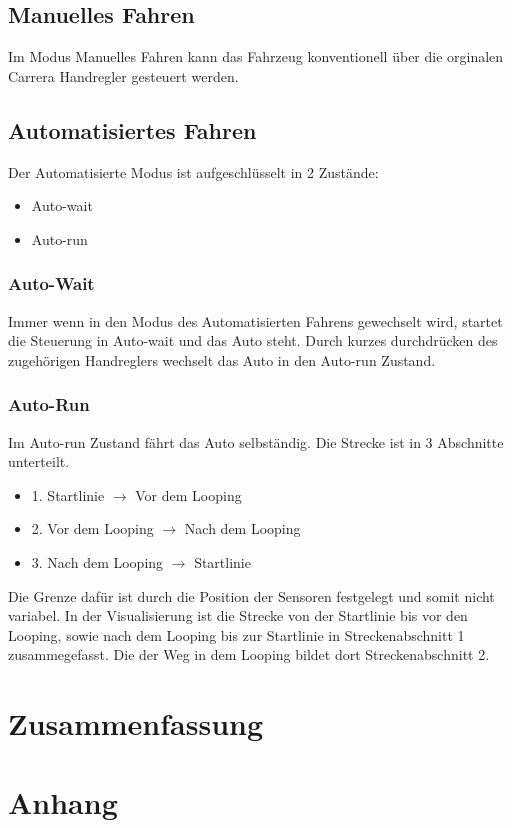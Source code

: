 \documentclass[a4paper, 11pt]{report}
\begin{document}
	\section{Manuelles Fahren}
		Im Modus Manuelles Fahren kann das Fahrzeug konventionell über die orginalen Carrera Handregler gesteuert
		werden.
	\section{Automatisiertes Fahren}
		Der Automatisierte Modus ist aufgeschlüsselt in 2 Zustände:
		\begin{itemize}
			\item Auto-wait
			\item Auto-run
		\end{itemize}
		\subsection{Auto-Wait}
		Immer wenn in den Modus des Automatisierten Fahrens gewechselt wird, startet die Steuerung in
		Auto-wait und das Auto steht.
		Durch kurzes durchdrücken des zugehörigen Handreglers wechselt das Auto in den Auto-run Zustand.
		\subsection{Auto-Run}
			Im Auto-run Zustand fährt das Auto selbständig. Die Strecke ist in 3 Abschnitte unterteilt.
			\begin{itemize}
				\item{1.} Startlinie $\rightarrow$ Vor dem Looping
				\item{2.} Vor dem Looping $\rightarrow$ Nach dem Looping
				\item{3.} Nach dem Looping $\rightarrow$ Startlinie
			\end{itemize}
			Die Grenze dafür ist durch die Position der Sensoren festgelegt und somit nicht variabel.
			In der Visualisierung ist die Strecke von der Startlinie bis vor den Looping, sowie nach dem Looping bis zur Startlinie in Streckenabschnitt 1 zusammegefasst.
			Die der Weg in dem Looping bildet dort Streckenabschnitt 2.




\chapter{Zusammenfassung}




\chapter{Anhang}
\end{document}
